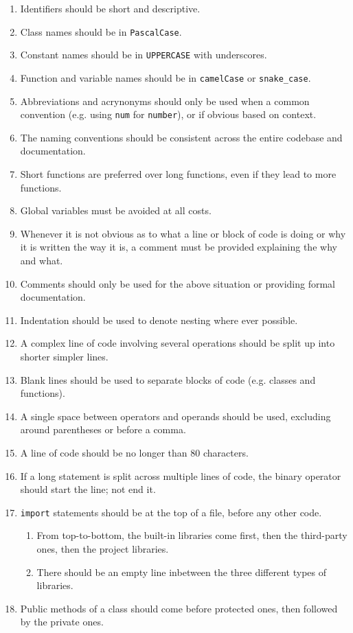 \documentclass[11pt]{article}
\begin{document}
\begin{enumerate}
    \item Identifiers should be short and descriptive.
    \item Class names should be in \texttt{PascalCase}.
    \item Constant names should be in \texttt{UPPERCASE} with underscores.
    \item Function and variable names should be in \texttt{camelCase} or \texttt{snake\_case}.
    \item Abbreviations and acrynonyms should only be used when a common convention (e.g. using \texttt{num} for \texttt{number}), or if obvious based on context.
    \item The naming conventions should be consistent across the entire codebase and documentation.
    \item Short functions are preferred over long functions, even if they lead to more functions.
    \item Global variables must be avoided at all costs.
    \item Whenever it is not obvious as to what a line or block of code is doing or why it is written the way it is, a comment must be provided explaining the why and what.
    \item Comments should only be used for the above situation or providing formal documentation.
    \item Indentation should be used to denote nesting where ever possible.
    \item A complex line of code involving several operations should be split up into shorter simpler lines.
    \item Blank lines should be used to separate blocks of code (e.g. classes and functions).
    \item A single space between operators and operands should be used, excluding around parentheses or before a comma.
    \item A line of code should be no longer than 80 characters.
    \item If a long statement is split across multiple lines of code, the binary operator should start the line; not end it.
    \item \texttt{import} statements should be at the top of a file, before any other code.
    \begin{enumerate}
        \item From top-to-bottom, the built-in libraries come first, then the third-party ones, then the project libraries.
        \item There should be an empty line inbetween the three different types of libraries.
    \end{enumerate}
    \item Public methods of a class should come before protected ones, then followed by the private ones.
\end{enumerate}
\end{document}
